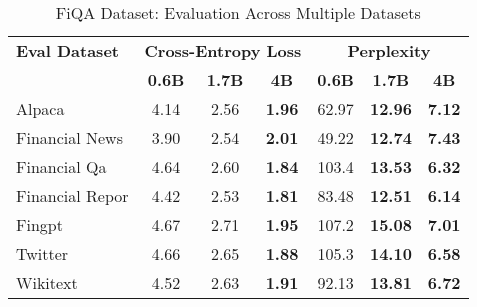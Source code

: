 
\begin{table}[h]
\centering
\caption[FiQA: Evaluation Results]{FiQA Dataset: Evaluation Across Multiple Datasets}
\label{tab:fiqa_results}
\begin{tabular}{l|ccc|ccc}
\hline
\textbf{Eval Dataset} & \multicolumn{3}{c|}{\textbf{Cross-Entropy Loss}} & \multicolumn{3}{c}{\textbf{Perplexity}} \\
\cline{2-4} \cline{5-7}
  & \textbf{0.6B} & \textbf{1.7B} & \textbf{4B} & \textbf{0.6B} & \textbf{1.7B} & \textbf{4B} \\
Alpaca & 4.14 & 2.56 & \textbf{1.96} & 62.97 & \textbf{12.96} & \textbf{7.12} \\
Financial News & 3.90 & 2.54 & \textbf{2.01} & 49.22 & \textbf{12.74} & \textbf{7.43} \\
Financial Qa & 4.64 & 2.60 & \textbf{1.84} & 103.4 & \textbf{13.53} & \textbf{6.32} \\
Financial Repor & 4.42 & 2.53 & \textbf{1.81} & 83.48 & \textbf{12.51} & \textbf{6.14} \\
Fingpt & 4.67 & 2.71 & \textbf{1.95} & 107.2 & \textbf{15.08} & \textbf{7.01} \\
Twitter & 4.66 & 2.65 & \textbf{1.88} & 105.3 & \textbf{14.10} & \textbf{6.58} \\
Wikitext & 4.52 & 2.63 & \textbf{1.91} & 92.13 & \textbf{13.81} & \textbf{6.72} \\
\hline
\end{tabular}
\end{table}

